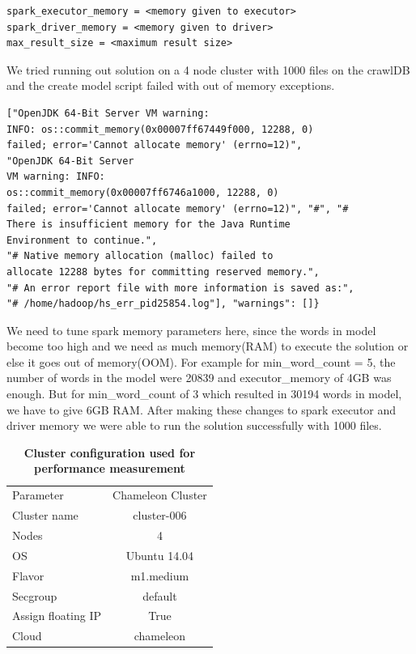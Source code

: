 \begin{verbatim}
spark_executor_memory = <memory given to executor>
spark_driver_memory = <memory given to driver>
max_result_size = <maximum result size>
\end{verbatim}

We tried running out solution on a 4 node cluster with 1000 files on
the crawlDB and the create model script failed with out
of memory exceptions.

\begin{verbatim}
["OpenJDK 64-Bit Server VM warning: 
INFO: os::commit_memory(0x00007ff67449f000, 12288, 0) 
failed; error='Cannot allocate memory' (errno=12)", 
"OpenJDK 64-Bit Server 
VM warning: INFO: 
os::commit_memory(0x00007ff6746a1000, 12288, 0) 
failed; error='Cannot allocate memory' (errno=12)", "#", "# 
There is insufficient memory for the Java Runtime 
Environment to continue.", 
"# Native memory allocation (malloc) failed to 
allocate 12288 bytes for committing reserved memory.", 
"# An error report file with more information is saved as:", 
"# /home/hadoop/hs_err_pid25854.log"], "warnings": []}
\end{verbatim}

We need to tune spark memory parameters here, since the words in model 
become too high and we need as much memory(RAM) to execute the
solution or else it goes out of memory(OOM). For example for 
min\_word\_count = 5, the number of words in the model were 20839 
and executor\_memory of 4GB was enough. But for min\_word\_count of 3 
which resulted in 30194 words in model, we have to give 6GB RAM. After
making these changes to spark executor and driver memory 
we were able to run the solution successfully with 1000 files. 

\begin{table}[htbp]
\centering
\caption{\bf Cluster configuration used for performance measurement}
  \begin{tabular}{ l | c }
    \hline
    Parameter & Chameleon Cluster  \\
    Cluster name & cluster-006 \\
    Nodes & 4  \\
    OS & Ubuntu 14.04  \\
    Flavor & m1.medium \\
    Secgroup & default  \\
    Assign floating IP & True  \\
    Cloud & chameleon \\
    \hline
  \end{tabular}
  \label{tab:cloud4node}
\end{table}

